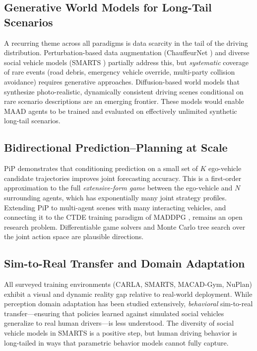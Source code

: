 \documentclass[12pt, a4paper]{article}
\begin{document}
\subsection{Generative World Models for Long-Tail Scenarios}
\label{sec:worldmodel}

A recurring theme across all paradigms is data scarcity in the tail of the driving
distribution. Perturbation-based data augmentation (ChauffeurNet \citep{bansal2018chauffeur})
and diverse social vehicle models (SMARTS \citep{zhou2020smarts}) partially address
this, but \emph{systematic} coverage of rare events (road debris, emergency vehicle
override, multi-party collision avoidance) requires generative approaches.
Diffusion-based world models that synthesize photo-realistic, dynamically
consistent driving scenes conditional on rare scenario descriptions are an
emerging frontier. These models would enable MAAD agents to be trained and evaluated
on effectively unlimited synthetic long-tail scenarios.

\subsection{Bidirectional Prediction--Planning at Scale}
\label{sec:gametheory}

PiP \citep{song2020pip} demonstrates that conditioning prediction on a small set
of $K$ ego-vehicle candidate trajectories improves joint forecasting accuracy. This
is a first-order approximation to the full \emph{extensive-form game} between the
ego-vehicle and $N$ surrounding agents, which has exponentially many joint
strategy profiles. Extending PiP to multi-agent scenes with many interacting
vehicles, and connecting it to the CTDE training paradigm of MADDPG
\citep{lowe2017multi}, remains an open research problem. Differentiable game
solvers and Monte Carlo tree search over the joint action space are plausible
directions.

\subsection{Sim-to-Real Transfer and Domain Adaptation}
\label{sec:simreal}

All surveyed training environments (CARLA, SMARTS, MACAD-Gym, NuPlan) exhibit a
visual and dynamic reality gap relative to real-world deployment. While perception
domain adaptation has been studied extensively, \emph{behavioral} sim-to-real
transfer---ensuring that policies learned against simulated social vehicles generalize
to real human drivers---is less understood. The diversity of social vehicle models in
SMARTS \citep{zhou2020smarts} is a positive step, but human driving behavior is
long-tailed in ways that parametric behavior models cannot fully capture.
\end{document}
